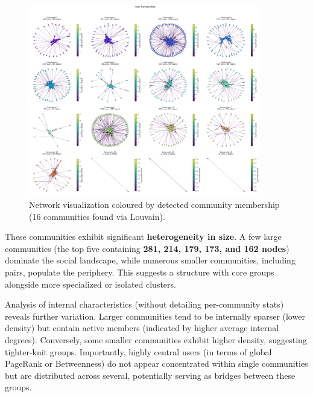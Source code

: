 \begin{figure}[h!]
    \centering
    \includegraphics[width=0.9\textwidth]{../communities.png}
    \caption{Network visualization coloured by detected community membership (16 communities found via Louvain).}
    \label{fig:community_visualization}
\end{figure}

These communities exhibit significant \textbf{heterogeneity in size}. A few large communities (the top five containing \textbf{281, 214, 179, 173, and 162 nodes}) dominate the social landscape, while numerous smaller communities, including pairs, populate the periphery. This suggests a structure with core groups alongside more specialized or isolated clusters.


Analysis of internal characteristics (without detailing per-community stats) reveals further variation. Larger communities tend to be internally sparser (lower density) but contain active members (indicated by higher average internal degrees). Conversely, some smaller communities exhibit higher density, suggesting tighter-knit groups. Importantly, highly central users (in terms of global PageRank or Betweenness) do not appear concentrated within single communities but are distributed across several, potentially serving as bridges between these groups.